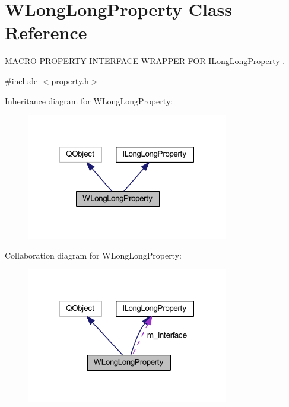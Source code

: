 \hypertarget{class_w_long_long_property}{\section{W\-Long\-Long\-Property Class Reference}
\label{class_w_long_long_property}
}


M\-A\-C\-R\-O P\-R\-O\-P\-E\-R\-T\-Y I\-N\-T\-E\-R\-F\-A\-C\-E W\-R\-A\-P\-P\-E\-R F\-O\-R \hyperlink{class_i_long_long_property}{I\-Long\-Long\-Property} .  




{\ttfamily \#include $<$property.\-h$>$}



Inheritance diagram for W\-Long\-Long\-Property\-:
\nopagebreak
\begin{figure}[H]
\begin{center}
\leavevmode
\includegraphics[width=249pt]{class_w_long_long_property__inherit__graph}
\end{center}
\end{figure}


Collaboration diagram for W\-Long\-Long\-Property\-:
\nopagebreak
\begin{figure}[H]
\begin{center}
\leavevmode
\includegraphics[width=249pt]{class_w_long_long_property__coll__graph}
\end{center}
\end{figure}
